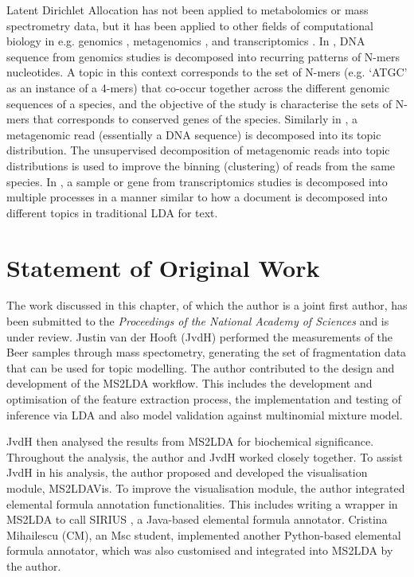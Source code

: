 Latent Dirichlet Allocation has not been applied to metabolomics or mass spectrometry data, but it has been applied to other fields of computational biology in e.g. genomics \cite{chen2010probabilistic}, metagenomics \cite{zhang2015exploiting}, and transcriptomics \cite{rogers2005latent}. In \cite{chen2010probabilistic}, DNA sequence from genomics studies is decomposed into recurring patterns of N-mers nucleotides. A topic in this context corresponds to the set of N-mers (e.g. `ATGC' as an instance of a 4-mers) that co-occur together across the different genomic sequences of a species, and the objective of the study is characterise the sets of N-mers that corresponds to conserved genes of the species. Similarly in \cite{zhang2015exploiting}, a metagenomic read (essentially a DNA sequence) is decomposed into its topic distribution. The unsupervised decomposition of metagenomic reads into topic distributions is used to improve the binning (clustering) of reads from the same species. In \cite{rogers2005latent}, a sample or gene from transcriptomics studies is decomposed into multiple processes in a manner similar to how a document is decomposed into different topics in traditional LDA for text.

\section{Statement of Original Work}

The work discussed in this chapter, of which the author is a joint first author, has been submitted to the \textit{Proceedings of the National Academy of Sciences} and is under review. Justin van der Hooft (JvdH) performed the measurements of the Beer samples through mass spectometry, generating the set of fragmentation data that can be used for topic modelling. The author contributed to the design and development of the MS2LDA workflow. This includes the development and optimisation of the feature extraction process, the implementation and testing of inference via LDA and also model validation against multinomial mixture model. 

JvdH then analysed the results from MS2LDA for biochemical significance. Throughout the analysis, the author and JvdH worked closely together. To assist JvdH in his analysis, the author proposed and developed the visualisation module, MS2LDAVis. To improve the visualisation module, the author integrated elemental formula annotation functionalities. This includes writing a wrapper in MS2LDA to call SIRIUS \cite{Bocker2009}, a Java-based elemental formula annotator. Cristina Mihailescu (CM), an Msc student, implemented another Python-based elemental formula annotator, which was also customised and integrated into MS2LDA by the author. 

